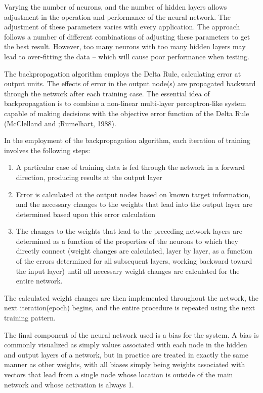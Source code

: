 \documentclass[conference]{IEEEtran}
\begin{document}
Varying the number of neurons, and the number of hidden layers allows adjustment in the operation and performance of the neural network.
The adjustment of these parameters varies with every application.
The approach follows a number of different combinations of adjusting these parameters to get the best result.
However, too many neurons with too many hidden layers may lead to over-fitting the data -- which will cause poor performance when testing.

The backpropagation algorithm employs the Delta Rule, calculating error at output units.
The effects of error in the output node(s) are propagated backward through the network after each training case.
The essential idea of backpropagation is to combine a non-linear multi-layer perceptron-like system capable of making decisions with the objective error function of the Delta Rule (McClelland and ;Rumelhart, 1988).

In the employment of the backpropagation algorithm, each iteration of training involves the following steps: 
\begin{enumerate}
\item A particular case of training data is fed through the network in a forward direction, producing results at the output layer
\item Error is calculated at the output nodes based on known target information, and the necessary changes to the weights that lead into the output layer are determined based upon this error calculation
\item  The changes to the weights that lead to the preceding network layers are determined as a function of the properties of the neurons to which they directly connect (weight changes are calculated, layer by layer, as a function of the errors determined for all subsequent layers, working backward toward the input layer) until all necessary weight changes are calculated for the entire network. 
\end{enumerate}

The calculated weight changes are then implemented throughout the network, the next iteration(epoch) begins, and the entire procedure is repeated using the next training pattern.

The final component of the neural network used is a bias for the system.
A bias is commonly visualized as simply values associated with each node in the hidden and output layers of a network, but in practice are treated in exactly the same manner as other weights, with all biases simply being weights associated with vectors that lead from a single node whose location is outside of the main network and whose activation is always 1.
\end{document}
